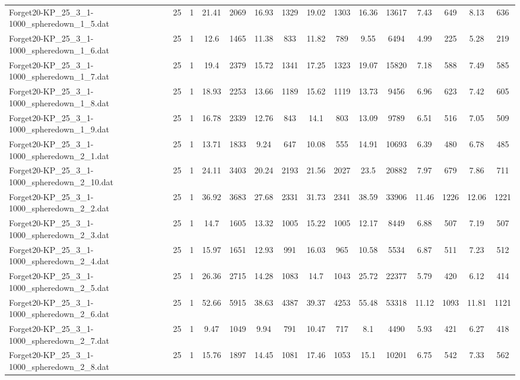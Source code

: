 \begin{table}[!ht]
{\begin{tabular}{lcccccccccccccc}
Forget20-KP\_25\_3\_1-1000\_spheredown\_1\_5.dat & 25 & 1 & 21.41 & 2069 & 16.93 & 1329 & 19.02 & 1303 & 16.36 & 13617 & 7.43 & 649 & 8.13 & 636 \\
Forget20-KP\_25\_3\_1-1000\_spheredown\_1\_6.dat & 25 & 1 & 12.6 & 1465 & 11.38 & 833 & 11.82 & 789 & 9.55 & 6494 & 4.99 & 225 & 5.28 & 219 \\
Forget20-KP\_25\_3\_1-1000\_spheredown\_1\_7.dat & 25 & 1 & 19.4 & 2379 & 15.72 & 1341 & 17.25 & 1323 & 19.07 & 15820 & 7.18 & 588 & 7.49 & 585 \\
Forget20-KP\_25\_3\_1-1000\_spheredown\_1\_8.dat & 25 & 1 & 18.93 & 2253 & 13.66 & 1189 & 15.62 & 1119 & 13.73 & 9456 & 6.96 & 623 & 7.42 & 605 \\
Forget20-KP\_25\_3\_1-1000\_spheredown\_1\_9.dat & 25 & 1 & 16.78 & 2339 & 12.76 & 843 & 14.1 & 803 & 13.09 & 9789 & 6.51 & 516 & 7.05 & 509 \\
Forget20-KP\_25\_3\_1-1000\_spheredown\_2\_1.dat & 25 & 1 & 13.71 & 1833 & 9.24 & 647 & 10.08 & 555 & 14.91 & 10693 & 6.39 & 480 & 6.78 & 485 \\
Forget20-KP\_25\_3\_1-1000\_spheredown\_2\_10.dat & 25 & 1 & 24.11 & 3403 & 20.24 & 2193 & 21.56 & 2027 & 23.5 & 20882 & 7.97 & 679 & 7.86 & 711 \\
Forget20-KP\_25\_3\_1-1000\_spheredown\_2\_2.dat & 25 & 1 & 36.92 & 3683 & 27.68 & 2331 & 31.73 & 2341 & 38.59 & 33906 & 11.46 & 1226 & 12.06 & 1221 \\
Forget20-KP\_25\_3\_1-1000\_spheredown\_2\_3.dat & 25 & 1 & 14.7 & 1605 & 13.32 & 1005 & 15.22 & 1005 & 12.17 & 8449 & 6.88 & 507 & 7.19 & 507 \\
Forget20-KP\_25\_3\_1-1000\_spheredown\_2\_4.dat & 25 & 1 & 15.97 & 1651 & 12.93 & 991 & 16.03 & 965 & 10.58 & 5534 & 6.87 & 511 & 7.23 & 512 \\
Forget20-KP\_25\_3\_1-1000\_spheredown\_2\_5.dat & 25 & 1 & 26.36 & 2715 & 14.28 & 1083 & 14.7 & 1043 & 25.72 & 22377 & 5.79 & 420 & 6.12 & 414 \\
Forget20-KP\_25\_3\_1-1000\_spheredown\_2\_6.dat & 25 & 1 & 52.66 & 5915 & 38.63 & 4387 & 39.37 & 4253 & 55.48 & 53318 & 11.12 & 1093 & 11.81 & 1121 \\
Forget20-KP\_25\_3\_1-1000\_spheredown\_2\_7.dat & 25 & 1 & 9.47 & 1049 & 9.94 & 791 & 10.47 & 717 & 8.1 & 4490 & 5.93 & 421 & 6.27 & 418 \\
Forget20-KP\_25\_3\_1-1000\_spheredown\_2\_8.dat & 25 & 1 & 15.76 & 1897 & 14.45 & 1081 & 17.46 & 1053 & 15.1 & 10201 & 6.75 & 542 & 7.33 & 562 \\

\end{tabular}}
\end{table}
